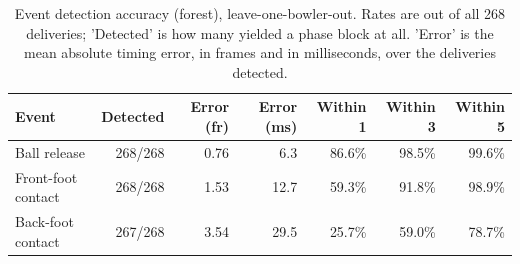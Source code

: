 \begin{table}[htbp]
  \centering
  \caption{Event detection accuracy (forest), leave-one-bowler-out. Rates are out of all 268 deliveries; 'Detected' is how many yielded a phase block at all. 'Error' is the mean absolute timing error, in frames and in milliseconds, over the deliveries detected.}
  \label{tab:events}
  \small
  \begin{tabular}{lrrrrrr}
    \toprule
    Event & Detected & Error (fr) & Error (ms) & Within 1 & Within 3 & Within 5 \\
    \midrule
    Ball release & 268/268 & 0.76 & 6.3 & 86.6\% & 98.5\% & 99.6\% \\
    Front-foot contact & 268/268 & 1.53 & 12.7 & 59.3\% & 91.8\% & 98.9\% \\
    Back-foot contact & 267/268 & 3.54 & 29.5 & 25.7\% & 59.0\% & 78.7\% \\
    \bottomrule
  \end{tabular}
\end{table}
